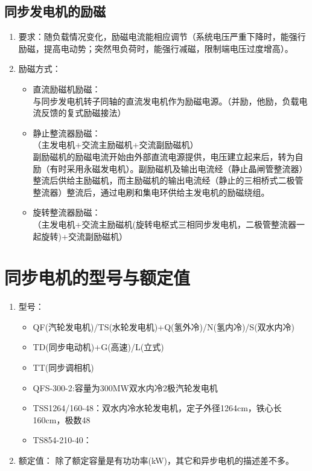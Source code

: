 \documentclass[blue]{elegantnote}
\begin{document}
\subsection{同步发电机的励磁}
\begin{enumerate}
	\item 要求：随负载情况变化，励磁电流能相应调节（系统电压严重下降时，能强行励磁，提高电动势；突然甩负荷时，能强行减磁，限制端电压过度增高）。
	\item 励磁方式：
	\begin{itemize}
		\item 直流励磁机励磁：\\与同步发电机转子同轴的直流发电机作为励磁电源。（并励，他励，负载电流反馈的复式励磁接法）
		\item 静止整流器励磁：\\（主发电机+交流主励磁机+交流副励磁机）\\副励磁机的励磁电流开始由外部直流电源提供，电压建立起来后，转为自励（有时采用永磁发电机）。副励磁机及输出电流经（静止晶闸管整流器）整流后供给主励磁机，而主励磁机的输出电流经（静止的三相桥式二极管整流器）整流后，通过{\color{blue}电刷和集电环}供给主发电机的励磁绕组。
		\item 旋转整流器励磁：\\（主发电机+交流主励磁机{\color{blue}(旋转电枢式三相同步发电机，二极管整流器一起旋转)}+交流副励磁机）\\
	\end{itemize}
\end{enumerate}
\section{同步电机的型号与额定值}
\begin{enumerate}
	\item 型号：
	\begin{itemize}
		\item QF(汽轮发电机)/TS(水轮发电机)+Q(氢外冷)/N(氢内冷)/S(双水内冷)
		\item TD(同步电动机)+G(高速)/L(立式)
		\item TT(同步调相机)\newpage
		\item QFS-300{\color{thid}-2}:容量为300MW双水内冷{\color{thid}2极}汽轮发电机
		\item TSS1264/160{\color{thid}-48}：双水内冷水轮发电机，定子外径1264cm，铁心长160cm，{\color{thid}极数48}
		\item TS854-210-40：
	\end{itemize}
	\item 额定值： {\color{blue}除了额定容量是有功功率(kW)}，其它和异步电机的描述差不多。
\end{enumerate}
\end{document}
